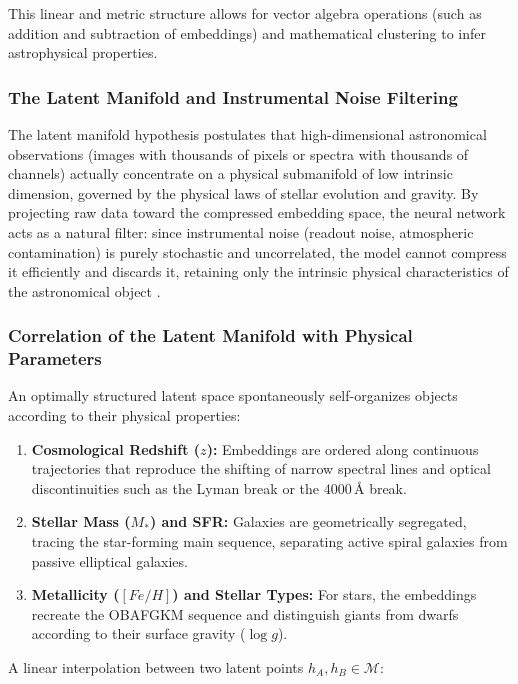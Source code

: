 This linear and metric structure allows for vector algebra operations (such as addition and subtraction of embeddings) and mathematical clustering to infer astrophysical properties.

\subsubsection{The Latent Manifold and Instrumental Noise Filtering}

The latent manifold hypothesis postulates that high-dimensional astronomical observations (images with thousands of pixels or spectra with thousands of channels) actually concentrate on a physical submanifold of low intrinsic dimension, governed by the physical laws of stellar evolution and gravity. By projecting raw data toward the compressed embedding space, the neural network acts as a natural filter: since instrumental noise (readout noise, atmospheric contamination) is purely stochastic and uncorrelated, the model cannot compress it efficiently and discards it, retaining only the intrinsic physical characteristics of the astronomical object \autocite{ar:portillo-2020}.

\subsubsection{Correlation of the Latent Manifold with Physical Parameters}

An optimally structured latent space spontaneously self-organizes objects according to their physical properties:
\begin{enumerate}
\item \textbf{Cosmological Redshift ($z$):} Embeddings are ordered along continuous trajectories that reproduce the shifting of narrow spectral lines and optical discontinuities such as the Lyman break or the $4000\,\text{\AA}$ break.
\item \textbf{Stellar Mass ($M_*$) and \gls{SFR}:} Galaxies are geometrically segregated, tracing the star-forming main sequence, separating active spiral galaxies from passive elliptical galaxies.
\item \textbf{Metallicity ($\left[Fe/H\right]$) and Stellar Types:} For stars, the embeddings recreate the OBAFGKM sequence and distinguish giants from dwarfs according to their surface gravity ($\log g$).
\end{enumerate}

A linear interpolation between two latent points $h_A, h_B \in \mathcal{M}$:

